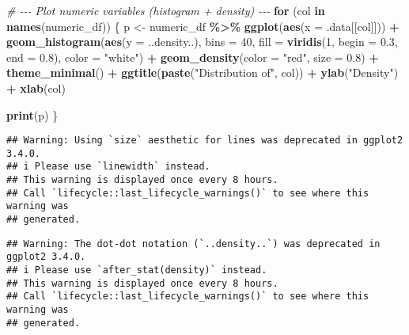 \documentclass[
]{article}
\newenvironment{Shaded}{\begin{snugshade}}{\end{snugshade}}
\newcommand{\AttributeTok}[1]{\textcolor[rgb]{0.13,0.29,0.53}{#1}}
\newcommand{\CommentTok}[1]{\textcolor[rgb]{0.56,0.35,0.01}{\textit{#1}}}
\newcommand{\ControlFlowTok}[1]{\textcolor[rgb]{0.13,0.29,0.53}{\textbf{#1}}}
\newcommand{\DecValTok}[1]{\textcolor[rgb]{0.00,0.00,0.81}{#1}}
\newcommand{\FloatTok}[1]{\textcolor[rgb]{0.00,0.00,0.81}{#1}}
\newcommand{\FunctionTok}[1]{\textcolor[rgb]{0.13,0.29,0.53}{\textbf{#1}}}
\newcommand{\NormalTok}[1]{#1}
\newcommand{\OtherTok}[1]{\textcolor[rgb]{0.56,0.35,0.01}{#1}}
\newcommand{\SpecialCharTok}[1]{\textcolor[rgb]{0.81,0.36,0.00}{\textbf{#1}}}
\newcommand{\StringTok}[1]{\textcolor[rgb]{0.31,0.60,0.02}{#1}}
\begin{document}
\begin{Shaded}
\begin{Highlighting}[]
\CommentTok{\# {-}{-}{-} Plot numeric variables (histogram + density) {-}{-}{-}}
\ControlFlowTok{for}\NormalTok{ (col }\ControlFlowTok{in} \FunctionTok{names}\NormalTok{(numeric\_df)) \{}
\NormalTok{  p }\OtherTok{\textless{}{-}}\NormalTok{ numeric\_df }\SpecialCharTok{\%\textgreater{}\%}
    \FunctionTok{ggplot}\NormalTok{(}\FunctionTok{aes}\NormalTok{(}\AttributeTok{x =}\NormalTok{ .data[[col]])) }\SpecialCharTok{+}
    \FunctionTok{geom\_histogram}\NormalTok{(}\FunctionTok{aes}\NormalTok{(}\AttributeTok{y =}\NormalTok{ ..density..), }\AttributeTok{bins =} \DecValTok{40}\NormalTok{,}
                   \AttributeTok{fill =} \FunctionTok{viridis}\NormalTok{(}\DecValTok{1}\NormalTok{, }\AttributeTok{begin =} \FloatTok{0.3}\NormalTok{, }\AttributeTok{end =} \FloatTok{0.8}\NormalTok{), }\AttributeTok{color =} \StringTok{"white"}\NormalTok{) }\SpecialCharTok{+}
    \FunctionTok{geom\_density}\NormalTok{(}\AttributeTok{color =} \StringTok{"red"}\NormalTok{, }\AttributeTok{size =} \FloatTok{0.8}\NormalTok{) }\SpecialCharTok{+}
    \FunctionTok{theme\_minimal}\NormalTok{() }\SpecialCharTok{+}
    \FunctionTok{ggtitle}\NormalTok{(}\FunctionTok{paste}\NormalTok{(}\StringTok{"Distribution of"}\NormalTok{, col)) }\SpecialCharTok{+}
    \FunctionTok{ylab}\NormalTok{(}\StringTok{"Density"}\NormalTok{) }\SpecialCharTok{+}
    \FunctionTok{xlab}\NormalTok{(col)}
  
  \FunctionTok{print}\NormalTok{(p)}
\NormalTok{\}}
\end{Highlighting}
\end{Shaded}

\begin{verbatim}
## Warning: Using `size` aesthetic for lines was deprecated in ggplot2 3.4.0.
## i Please use `linewidth` instead.
## This warning is displayed once every 8 hours.
## Call `lifecycle::last_lifecycle_warnings()` to see where this warning was
## generated.
\end{verbatim}

\begin{verbatim}
## Warning: The dot-dot notation (`..density..`) was deprecated in ggplot2 3.4.0.
## i Please use `after_stat(density)` instead.
## This warning is displayed once every 8 hours.
## Call `lifecycle::last_lifecycle_warnings()` to see where this warning was
## generated.
\end{verbatim}
\end{document}

